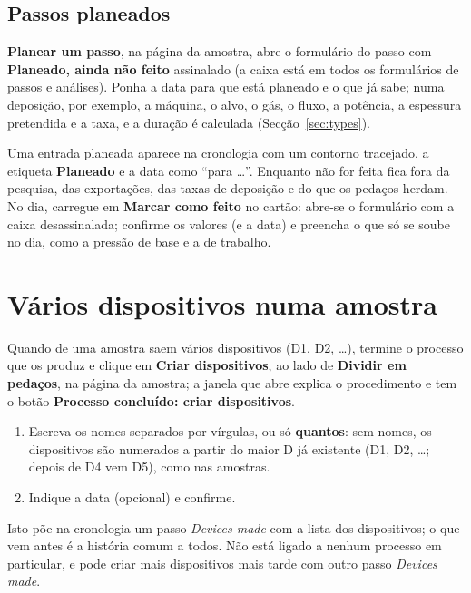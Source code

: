 \documentclass[11pt,a4paper]{article}
\newcommand{\ui}[1]{\textsf{\textbf{#1}}}
\begin{document}
\subsection{Passos planeados}
\label{sec:planned}

\ui{Planear um passo}, na página da amostra, abre o formulário do passo com
\ui{Planeado, ainda não feito} assinalado (a caixa está em todos os
formulários de passos e análises). Ponha a data para que está planeado e o
que já sabe; numa deposição, por exemplo, a máquina, o alvo, o gás, o fluxo,
a potência, a espessura pretendida e a taxa, e a duração é calculada
(Secção~\ref{sec:types}).

Uma entrada planeada aparece na cronologia com um contorno tracejado, a
etiqueta \ui{Planeado} e a data como ``para \ldots''. Enquanto não for feita
fica fora da pesquisa, das exportações, das taxas de deposição e do que os
pedaços herdam. No dia, carregue em \ui{Marcar como feito} no cartão: abre-se
o formulário com a caixa desassinalada; confirme os valores (e a data) e
preencha o que só se soube no dia, como a pressão de base e a de trabalho.

\section{Vários dispositivos numa amostra}
\label{sec:devices}

Quando de uma amostra saem vários dispositivos (D1, D2, \ldots), termine o
processo que os produz e clique em \ui{Criar dispositivos}, ao lado de
\ui{Dividir em pedaços}, na página da amostra; a janela que abre explica o
procedimento e tem o botão \ui{Processo concluído: criar dispositivos}.

\begin{enumerate}
  \item Escreva os nomes separados por vírgulas, ou só \ui{quantos}: sem
        nomes, os dispositivos são numerados a partir do maior D já existente
        (D1, D2, \ldots; depois de D4 vem D5), como nas amostras.
  \item Indique a data (opcional) e confirme.
\end{enumerate}

Isto põe na cronologia um passo \emph{Devices made} com a lista dos
dispositivos; o que vem antes é a história comum a todos. Não está ligado a
nenhum processo em particular, e pode criar mais dispositivos mais tarde com
outro passo \emph{Devices made}.
\end{document}
